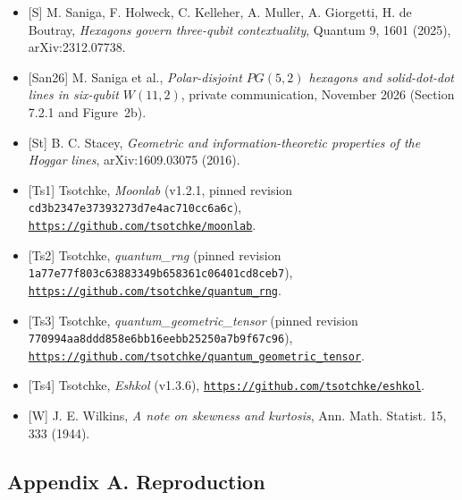 \documentclass[11pt,a4paper]{article}
\begin{document}
\begin{itemize}
\item
  {[}S{]} M. Saniga, F. Holweck, C. Kelleher, A. Muller, A. Giorgetti, H. de Boutray, \emph{Hexagons govern three-qubit contextuality}, Quantum 9, 1601 (2025), arXiv:2312.07738.
\item
  {[}San26{]} M. Saniga et al., \emph{Polar-disjoint \(PG(5,2)\) hexagons and solid-dot-dot lines in six-qubit \(W(11,2)\)}, private communication, November 2026 (Section 7.2.1 and Figure~2b).
\item
  {[}St{]} B. C. Stacey, \emph{Geometric and information-theoretic properties of the Hoggar lines}, arXiv:1609.03075 (2016).
\item
  {[}Ts1{]} Tsotchke, \emph{Moonlab} (v1.2.1, pinned revision \texttt{cd3b2347\allowbreak e3739327\allowbreak 3d7e4ac7\allowbreak 10cc6a6c}), \href{https://github.com/tsotchke/moonlab}{\nolinkurl{https://github.com/tsotchke/moonlab}}.
\item
  {[}Ts2{]} Tsotchke, \emph{quantum\_rng} (pinned revision \texttt{1a77e77f\allowbreak 803c6388\allowbreak 3349b658\allowbreak 361c0640\allowbreak 1cd8ceb7}), \href{https://github.com/tsotchke/quantum_rng}{\nolinkurl{https://github.com/tsotchke/quantum_rng}}.
\item
  {[}Ts3{]} Tsotchke, \emph{quantum\_geometric\_tensor} (pinned revision \texttt{770994aa\allowbreak 8ddd858e\allowbreak 6bb16eeb\allowbreak b25250a7\allowbreak b9f67c96}), \href{https://github.com/tsotchke/quantum_geometric_tensor}{\nolinkurl{https://github.com/tsotchke/quantum_geometric_tensor}}.
\item
  {[}Ts4{]} Tsotchke, \emph{Eshkol} (v1.3.6), \href{https://github.com/tsotchke/eshkol}{\nolinkurl{https://github.com/tsotchke/eshkol}}.
\item
  {[}W{]} J. E. Wilkins, \emph{A note on skewness and kurtosis}, Ann. Math. Statist. 15, 333 (1944).
\end{itemize}

\subsection{Appendix A. Reproduction}\label{appendix-a-reproduction}
\end{document}

